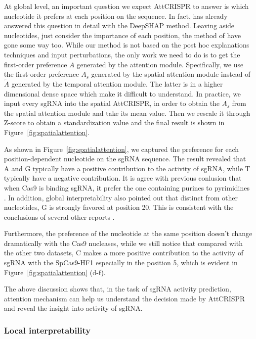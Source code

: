 \documentclass{bioinfo}
\begin{document}
At global level, an important question we expect AttCRISPR to answer is which nucleotide it prefers at each position on the sequence. 
In fact, \citeauthor{wang2019optimized} has already answered this question in detail with the DeepSHAP method.
Leaving aside nucleotides, just consider the importance of each position, the method of \citeauthor{Liu2019} have gone some way too. 
While our method is not based on the post hoc explanations techniques and input perturbations, the only work we need to do is to get the first-order preference $A$ generated by the attention module.
Specifically, we use the first-order preference $A_s$ generated by the spatial attention module instead of  $\tilde{A}$ generated by the temporal attention module. 
The latter is in a higher dimensional dense space which make it difficult to understand. 
In practice, we input every sgRNA into the spatial AttCRISPR, in order to obtain the $A_s$ from the spatial attention module and take its mean value. 
Then we rescale it through Z-score to obtain a standardization value and the final result is shown in Figure~\ref{fig:spatialattention}. 

As shown in Figure~\ref{fig:spatialattention}, we captured the preference for each position-dependent nucleotide on the sgRNA sequence. 
The result revealed that A and G typically have a positive contribution to the activity of sgRNA, while T typically have a negative contribution. 
It is agree with previous conlusion that when Cas9 is binding sgRNA, it prefer the one containing purines to pyrimidines \citep{wang2014genetic}. 
In addition, global interpretability also pointed out that distinct from other nucleotides, G is strongly favored at position 20. 
This is consistent with the conclusions of several other reports \citep{Wong2015,Doench2014}.

Furthermore, the preference of the nucleotide at the same position doesn't change dramatically with the Cas9 nucleases, 
while we still notice that compared with the other two datasets, 
C makes a more positive contribution to the activity of sgRNA with the SpCas9-HF1 especially in the position 5, which is evident in Figure~\ref{fig:spatialattention} (d-f). 

The above discussion shows that, in the task of sgRNA activity prediction, 
attention mechanism can help us understand the decision made by AttCRISPR and reveal the insight into activity of sgRNA. 

\subsubsection{Local interpretability}\label{section:local}
\end{document}
